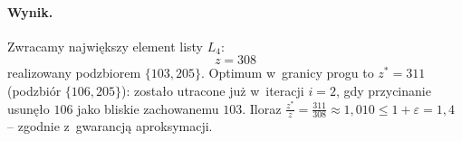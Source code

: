 \paragraph{Wynik.}
Zwracamy największy element listy $L_4$:
\[
	\boxed{z = 308}
\]
realizowany podzbiorem $\{103, 205\}$. Optimum w~granicy progu to
$z^* = 311$ (podzbiór $\{106, 205\}$): zostało utracone już w~iteracji
$i = 2$, gdy przycinanie usunęło $106$ jako bliskie zachowanemu $103$. Iloraz
$\frac{z^*}{z} = \frac{311}{308} \approx 1{,}010 \leq 1 + \varepsilon = 1{,}4$
-- zgodnie z~gwarancją aproksymacji.
